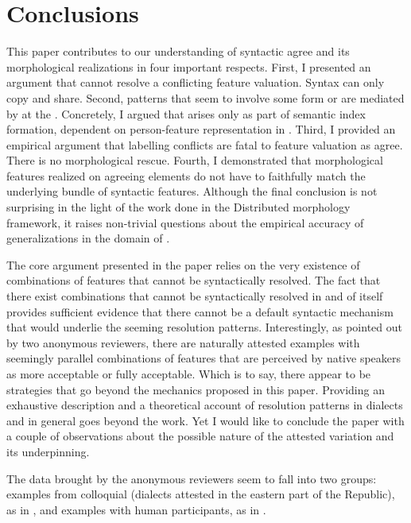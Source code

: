 \documentclass[output=paper,modfontsnewtxmath,hidelinks]{langscibook}
\begin{document}
\section{Conclusions}

This paper contributes to our understanding of syntactic agree and its morphological realizations in four important respects. First, I presented an argument that  cannot resolve a conflicting feature valuation. Syntax can only copy and share. Second, patterns that seem to involve some form or  are mediated by  at the . Concretely, I argued that  arises only as part of semantic index formation, dependent on person-feature representation in . Third, I provided an empirical argument that labelling conflicts are fatal to feature valuation as agree. There is no morphological rescue. Fourth, I demonstrated that morphological features realized on agreeing elements do not have to faithfully match the underlying bundle of syntactic features. Although the final conclusion is not surprising in the light of the work done in the Distributed morphology framework, it raises non-trivial questions about the empirical accuracy of generalizations in the domain of . 

The core argument presented in the paper relies on the very existence of combinations of features that cannot be syntactically resolved. The fact that there exist combinations that cannot be syntactically resolved in and of itself provides sufficient evidence that there cannot be a default syntactic mechanism that would underlie the seeming resolution patterns. Interestingly, as pointed out by two anonymous reviewers, there are naturally attested examples with seemingly parallel combinations of features that are perceived by native speakers as more acceptable or fully acceptable. Which is to say, there appear to be  strategies that go beyond the mechanics proposed in this paper. Providing an exhaustive description and a theoretical account of  resolution patterns in  dialects and  in general  goes beyond the  work. Yet I would like to conclude the paper with a couple of observations about the possible nature of the attested variation and its underpinning.

The data brought by the anonymous reviewers seem to fall into two groups: examples from colloquial  (dialects attested in the eastern part of the  Republic), as in , and examples with human participants, as in .
\end{document}
